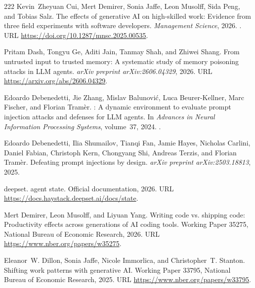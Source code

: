 \begin{thebibliography}{222}
Kevin~Zheyuan Cui, Mert Demirer, Sonia Jaffe, Leon Musolff, Sida Peng, and
  Tobias Salz.
\newblock The effects of generative {AI} on high-skilled work: Evidence from
  three field experiments with software developers.
\newblock \emph{Management Science}, 2026.
\newblock {}.
\newblock URL \url{https://doi.org/10.1287/mnsc.2025.00535}.

Pritam Dash, Tongyu Ge, Aditi Jain, Tanmay Shah, and Zhiwei Shang.
\newblock From untrusted input to trusted memory: A systematic study of memory
  poisoning attacks in {LLM} agents.
\newblock \emph{arXiv preprint arXiv:2606.04329}, 2026.
\newblock URL \url{https://arxiv.org/abs/2606.04329}.

Edoardo Debenedetti, Jie Zhang, Mislav Balunovi{\'c}, Luca Beurer-Kellner, Marc
  Fischer, and Florian Tram{\`e}r.
: A dynamic environment to evaluate prompt injection
  attacks and defenses for {LLM} agents.
\newblock In \emph{Advances in Neural Information Processing Systems},
  volume~37, 2024.
\newblock {}.

Edoardo Debenedetti, Ilia Shumailov, Tianqi Fan, Jamie Hayes, Nicholas Carlini,
  Daniel Fabian, Christoph Kern, Chongyang Shi, Andreas Terzis, and Florian
  Tram{\`e}r.
\newblock Defeating prompt injections by design.
\newblock \emph{arXiv preprint arXiv:2503.18813}, 2025.

{deepset}.
 agent state.
\newblock Official documentation, 2026.
\newblock URL \url{https://docs.haystack.deepset.ai/docs/state}.

Mert Demirer, Leon Musolff, and Liyuan Yang.
\newblock Writing code vs. shipping code: Productivity effects across
  generations of {AI} coding tools.
\newblock Working Paper 35275, National Bureau of Economic Research, 2026.
\newblock URL \url{https://www.nber.org/papers/w35275}.

Eleanor~W. Dillon, Sonia Jaffe, Nicole Immorlica, and Christopher~T. Stanton.
\newblock Shifting work patterns with generative {AI}.
\newblock Working Paper 33795, National Bureau of Economic Research, 2025.
\newblock URL \url{https://www.nber.org/papers/w33795}.


\end{thebibliography}
